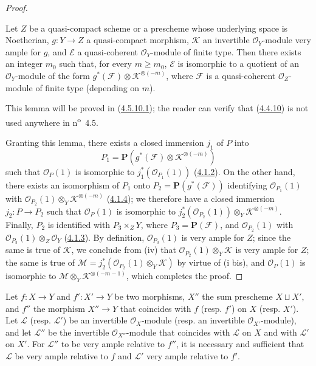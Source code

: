 \begin{proof}
\begin{lemma}[4.4.10.1]
\label{II.4.4.10.1}
Let $Z$ be a quasi-compact scheme or a prescheme whose underlying space
is Noetherian, $g:Y\to Z$ a quasi-compact morphism, $\mathcal{K}$ an
invertible $\mathcal{O}_Y$-module very ample for $g$, and $\mathcal{E}$ a
quasi-coherent $\mathcal{O}_Y$-module of finite type. Then there exists an
integer $m_0$ such that, for every $m\geq m_0$, $\mathcal{E}$ is isomorphic to
a quotient of an $\mathcal{O}_Y$-module of the form
$g^*(\mathcal{F})\otimes\mathcal{K}^{\otimes(-m)}$, where $\mathcal{F}$ is a
quasi-coherent $\mathcal{O}_Z$-module of finite type (depending on $m$).
\end{lemma}

This lemma will be proved in (\hyperref[II.4.5.10.1]{4.5.10.1}); the reader
can verify that (\hyperref[II.4.4.10]{4.4.10}) is not used anywhere
in n\textsuperscript{o}~4.5.


Granting this lemma, there exists a closed immersion $j_1$ of $P$ into
\[
  P_1=\mathbf{P}(g^*(\mathcal{F})\otimes\mathcal{K}^{\otimes(-m)})
\]
such that $\mathcal{O}_P(1)$ is isomorphic to
$j_1^*(\mathcal{O}_{P_1}(1))$ (\hyperref[II.4.1.2]{4.1.2}). On the other
hand, there exists an isomorphism of $P_1$ onto
$P_2=\mathbf{P}(g^*(\mathcal{F}))$ identifying
$\mathcal{O}_{P_1}(1)$ with
$\mathcal{O}_{P_2}(1)\otimes_Y\mathcal{K}^{\otimes(-m)}$
(\hyperref[II.4.1.4]{4.1.4}); we therefore have a closed immersion
$j_2:P\to P_2$ such that $\mathcal{O}_P(1)$ is isomorphic to
$j_2^*(\mathcal{O}_{P_2}(1))\otimes_Y\mathcal{K}^{\otimes(-m)}$. Finally,
$P_2$ is identified with $P_3\times_ZY$, where $P_3=\mathbf{P}(\mathcal{F})$,
and $\mathcal{O}_{P_2}(1)$ with
$\mathcal{O}_{P_3}(1)\otimes_Z\mathcal{O}_Y$
(\hyperref[II.4.1.3]{4.1.3}). By definition,
$\mathcal{O}_{P_3}(1)$ is very ample for $Z$; since the same is true of
$\mathcal{K}$, we conclude from (iv) that
$\mathcal{O}_{P_2}(1)\otimes_Y\mathcal{K}$ is very ample for $Z$; the same is
true of
$\mathcal{M}=j_2^*(\mathcal{O}_{P_2}(1)\otimes_Y\mathcal{K})$ by virtue of
(i bis), and $\mathcal{O}_P(1)$ is isomorphic to
$\mathcal{M}\otimes_Y\mathcal{K}^{\otimes(-m-1)}$, which completes the
proof.
\end{proof}

\begin{proposition}[4.4.11]
\label{II.4.4.11}
Let $f:X\to Y$ and $f':X'\to Y$ be two morphisms, $X''$ the sum prescheme
$X\sqcup X'$, and $f''$ the morphism $X''\to Y$ that coincides with $f$ (resp.
$f'$) on $X$ (resp. $X'$). Let $\mathcal{L}$ (resp. $\mathcal{L}'$) be an
invertible $\mathcal{O}_X$-module (resp. an invertible
$\mathcal{O}_{X'}$-module), and let $\mathcal{L}''$ be the invertible
$\mathcal{O}_{X''}$-module that coincides with $\mathcal{L}$ on $X$ and with
$\mathcal{L}'$ on $X'$. For $\mathcal{L}''$ to be very ample relative to
$f''$, it is necessary and sufficient that $\mathcal{L}$ be very ample
relative to $f$ and $\mathcal{L}'$ very ample relative to $f'$.
\end{proposition}

